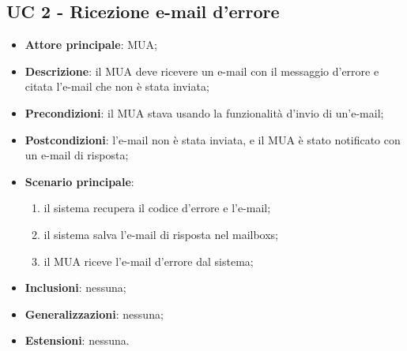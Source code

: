 \subsection{UC 2 - Ricezione e-mail d'errore} \label{sec:UC2}
    \begin{itemize}
        \item \textbf{Attore principale}: MUA;
        \item \textbf{Descrizione}: il MUA deve ricevere un e-mail con il messaggio d'errore e citata l'e-mail che non è stata inviata;
        \item \textbf{Precondizioni}: il MUA stava usando la funzionalità d'invio di un'e-mail;
        \item \textbf{Postcondizioni}: l'e-mail non è stata inviata, e il MUA è stato notificato con un e-mail di risposta;
        \item \textbf{Scenario principale}:
            \begin{enumerate}
                \item il sistema recupera il codice d'errore e l'e-mail;
                \item il sistema salva l'e-mail di risposta nel mailboxs;
                \item il MUA riceve l'e-mail d'errore dal sistema;
            \end{enumerate}
        \item \textbf{Inclusioni}: nessuna;
        \item \textbf{Generalizzazioni}: nessuna;
        \item \textbf{Estensioni}: nessuna.
    \end{itemize}
